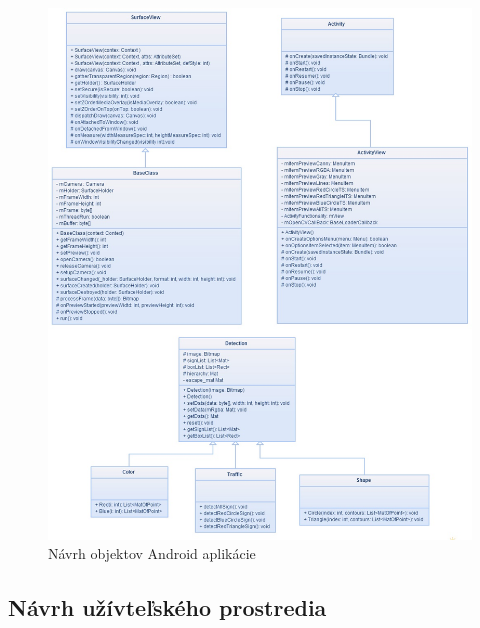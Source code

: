 \documentclass[12pt]{article}
\begin{document}
\begin{figure}[p]
\centering
\includegraphics[width=1\textwidth,natwidth=800,natheight=1000]{uml_objects.jpg}
\vspace{-10pt}
\caption{Návrh objektov Android aplikácie}
\vspace{-10pt}
\label{uml_objects_diagram}
\end{figure}
\subsection{Návrh užívteľského prostredia}
\end{document}
